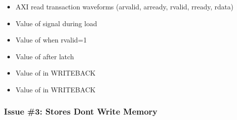 \begin{record}
\begin{itemize}
\tightlist
\item
  AXI read transaction waveforms (arvalid, arready, rvalid, rready,
  rdata)
\item
  Value of  signal during load
\item
  Value of  when rvalid=1
\item
  Value of  after latch
\item
  Value of  in WRITEBACK
\item
  Value of  in WRITEBACK
\end{itemize}

\end{record}

\subsubsection{Issue \#3: Stores Don\textquotesingle t Write Memory}\label{cr:fix:rtl-debug-report:issue-3-stores-dont-write-memory}

